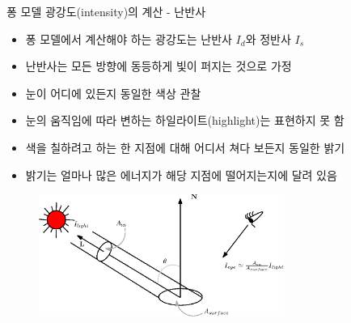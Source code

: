 \documentclass{beamer}
\begin{document}
\begin{frame}[fragile]{퐁 모델 광강도(intensity)의 계산 - 난반사}

\begin{itemize}
\item 퐁 모델에서 계산해야 하는 광강도는 난반사 $I_d$와 정반사 $I_s$
\item 난반사는 모든 방향에 동등하게 빛이 퍼지는 것으로 가정
\item 눈이 어디에 있든지 동일한 색상 관찰
\item 눈의 움직임에 따라 변하는 하일라이트(highlight)는 표현하지 못 함
\item 색을 칠하려고 하는 한 지점에 대해 어디서 쳐다 보든지 동일한 밝기
\item 밝기는 얼마나 많은 에너지가 해당 지점에 떨어지는지에 달려 있음
\end{itemize}

\begin{figure}[h!]
  \centering
    \includegraphics[height=4cm]{OGL_light/diffuseConcept.eps}
\end{figure}


\end{frame}
\end{document}
